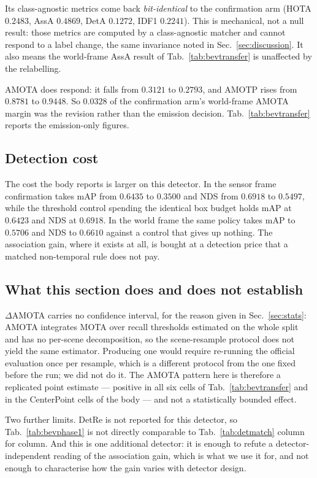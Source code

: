 Its class-agnostic metrics come back \emph{bit-identical} to the confirmation
arm (HOTA $0.2483$, AssA $0.4869$, DetA $0.1272$, IDF1 $0.2241$). This is
mechanical, not a null result: those metrics are computed by a class-agnostic
matcher and cannot respond to a label change, the same invariance noted in
Sec.~\ref{sec:discussion}. It also means the world-frame AssA result of
Tab.~\ref{tab:bevtransfer} is unaffected by the relabelling.

AMOTA does respond: it falls from $0.3121$ to $0.2793$, and AMOTP rises from
$0.8781$ to $0.9448$. So $0.0328$ of the confirmation arm's world-frame AMOTA
margin was the revision rather than the emission decision. Tab.~\ref{tab:bevtransfer}
reports the emission-only figures.

\subsection*{Detection cost}
The cost the body reports is larger on this detector. In the sensor frame
confirmation takes mAP from $0.6435$ to $0.3500$ and NDS from $0.6918$ to
$0.5497$, while the threshold control spending the identical box budget holds
mAP at $0.6423$ and NDS at $0.6918$. In the world frame the same policy takes
mAP to $0.5706$ and NDS to $0.6610$ against a control that gives up nothing.
The association gain, where it exists at all, is bought at a detection price
that a matched non-temporal rule does not pay.

\subsection*{What this section does and does not establish}
$\Delta$AMOTA carries no confidence interval, for the reason given in
Sec.~\ref{sec:stats}: AMOTA integrates MOTA over recall thresholds estimated on
the whole split and has no per-scene decomposition, so the scene-resample
protocol does not yield the same estimator. Producing one would require
re-running the official evaluation once per resample, which is a different
protocol from the one fixed before the run; we did not do it. The AMOTA pattern here
is therefore a replicated point estimate --- positive in all six cells of
Tab.~\ref{tab:bevtransfer} and in the CenterPoint cells of the body --- and not
a statistically bounded effect.

Two further limits. DetRe is not reported for this detector, so
Tab.~\ref{tab:bevphase1} is not directly comparable to
Tab.~\ref{tab:detmatch} column for column. And this is one additional detector:
it is enough to refute a detector-independent reading of the association gain,
which is what we use it for, and not enough to characterise how the gain varies
with detector design.
